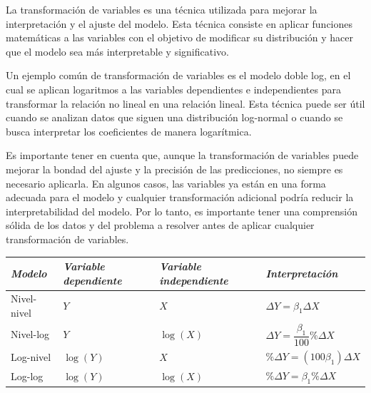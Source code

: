 \documentclass[
]{book}
\newcounter{none} %
\begin{document}
La transformación de variables es una técnica utilizada para mejorar la
interpretación y el ajuste del modelo. Esta técnica consiste en aplicar
funciones matemáticas a las variables con el objetivo de modificar su
distribución y hacer que el modelo sea más interpretable y
significativo.

Un ejemplo común de transformación de variables es el modelo doble log,
en el cual se aplican logaritmos a las variables dependientes e
independientes para transformar la relación no lineal en una relación
lineal. Esta técnica puede ser útil cuando se analizan datos que siguen
una distribución log-normal o cuando se busca interpretar los
coeficientes de manera logarítmica.

Es importante tener en cuenta que, aunque la transformación de variables
puede mejorar la bondad del ajuste y la precisión de las predicciones,
no siempre es necesario aplicarla. En algunos casos, las variables ya
están en una forma adecuada para el modelo y cualquier transformación
adicional podría reducir la interpretabilidad del modelo. Por lo tanto,
es importante tener una comprensión sólida de los datos y del problema a
resolver antes de aplicar cualquier transformación de variables.

{\def\LTcaptype{none} %
\begin{longtable}[]{@{}
  >{\raggedright\arraybackslash}p{}
  >{\raggedright\arraybackslash}p{}
  >{\raggedright\arraybackslash}p{}
  >{\raggedright\arraybackslash}p{}@{}}
\toprule\noalign{}
\begin{minipage}[b]{\linewidth}\raggedright
\emph{Modelo}
\end{minipage} & \begin{minipage}[b]{\linewidth}\raggedright
\emph{Variable dependiente}
\end{minipage} & \begin{minipage}[b]{\linewidth}\raggedright
\emph{Variable independiente}
\end{minipage} & \begin{minipage}[b]{\linewidth}\raggedright
\emph{Interpretación}
\end{minipage} \\
\midrule\noalign{}
\endhead
\bottomrule\noalign{}
\endlastfoot
Nivel-nivel & \(Y\) & \(X\) & \(\Delta Y = \beta_1 \Delta X\) \\
Nivel-log & \(Y\) & \(\log(X)\) & \(\Delta Y = \dfrac{\beta_1}{100}\% \Delta X\) \\
Log-nivel & \(\log(Y)\) & \(X\) & \(\%\Delta Y = (100\beta_1)\Delta X\) \\
Log-log & \(\log(Y)\) & \(\log(X)\) & \(\%\Delta Y = \beta_1 \%\Delta X\) \\
\end{longtable}
}
\end{document}

